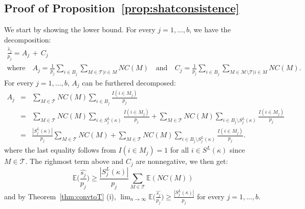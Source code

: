 \documentclass[aos]{imsart}
\theoremstyle{plain}
\newcommand{\E}{\mathbb{E}}
\newcommand{\M}{\mathcal{M}}
\newcommand{\T}{\mathcal{T}}
\begin{document}
\subsection{Proof of Proposition~\ref{prop:shatconsistence}}
We start by showing the lower bound. For every $j=1,\ldots,b$, we have the decomposition:
\begin{gather}\label{eq:decompshat}
    \frac{\widehat{s}_j}{p_j}
   =A_j\,+\, C_j \\
       \text{where} \quad A_j=\frac{1}{p_j}\sum_{i \in B_j}\sum_{M \in \T|i\in M}NC(M) \quad\text{and}\quad  C_j=\frac{1}{p_j}\sum_{i \in B_j}\sum_{M \in \M\setminus \T|i\in M}NC(M). \nonumber
\end{gather}
For every $j=1,\ldots,b$, $A_j$ can be furthered decomposed:
\begin{eqnarray*}
  A_j
   &=& \sum_{M \in \T}NC(M)\sum_{i \in B_j}\frac{I(i\in M_j)}{p_j}\\
   &=& \sum_{M \in \T}NC(M)\sum_{i \in S^{L}_j(\kappa)}\frac{I(i\in M_j)}{p_j}+\sum_{M \in \T}NC(M)\sum_{i \in B_j\setminus S^{L}_j(\kappa)}\frac{I(i\in M_j)}{p_j}\\
   &=& \frac{|S^{L}_j(\kappa)|}{p_j}\sum_{M \in \T}NC(M)+\sum_{M \in \T}NC(M)\sum_{i \in B_j\setminus S^{L}_j(\kappa)}\frac{I(i\in M_j)}{p_j}.
\end{eqnarray*}
where the last equality follows from $I(i\in M_j)=1$ for all $i\in S^L(\kappa)$ since $M\in\T$. The righmost term above and $C_j$ are nonnegative, we then get:
$$\E\Big(\frac{\widehat{s_j}}{p_j}\Big)\geq\frac{|S^{L}_j(\kappa)|}{p_j}\sum_{M \in \T}\E(NC(M))$$
and by Theorem~\ref{thm:convtoT} (i), $\lim_{n\to\infty}\E\Big(\frac{\widehat{s_j}}{p_j}\Big)\geq \frac{|S^{L}_j(\kappa)|}{p_j}$ for every $j=1,\ldots,b$.
\end{document}
